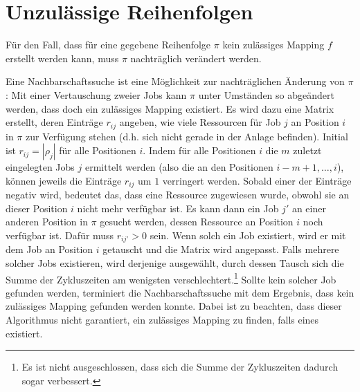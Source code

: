 \documentclass{scrreprt}
\begin{document}
\section{Unzulässige Reihenfolgen}
\label{sec:UnzulaessigeReihenfolgen}
Für den Fall, dass für eine gegebene Reihenfolge $\pi$ kein zulässiges Mapping $f$ erstellt werden kann, muss $\pi$ nachträglich verändert werden.

Eine Nachbarschaftssuche ist eine Möglichkeit zur nachträglichen Änderung von $\pi$:
Mit einer Vertauschung zweier Jobs kann $\pi$ unter Umständen so abgeändert werden, dass doch ein zulässiges Mapping existiert.
Es wird dazu eine Matrix erstellt, deren Einträge $r_{ij}$ angeben, wie viele Ressourcen für Job $j$ an Position $i$ in $\pi$ zur Verfügung stehen
(d.h. sich nicht gerade in der Anlage befinden).
Initial ist $r_{ij}=|\rho_j|$ für alle Positionen $i$.
Indem für alle Positionen $i$ die $m$ zuletzt eingelegten Jobs $j$ ermittelt werden (also die an den Positionen $i-m+1,\ldots,i$),
können jeweils die Einträge $r_{ij}$ um $1$ verringert werden.
Sobald einer der Einträge negativ wird, bedeutet das, dass eine Ressource zugewiesen wurde, obwohl sie an dieser Position $i$ nicht mehr verfügbar ist.
Es kann dann ein Job $j'$ an einer anderen Position in $\pi$ gesucht werden, dessen Ressource an Position $i$ noch verfügbar ist.
Dafür muss $r_{ij'}>0$ sein.
Wenn solch ein Job existiert, wird er mit dem Job an Position $i$ getauscht und die Matrix wird angepasst.
Falls mehrere solcher Jobs existieren, wird derjenige ausgewählt, durch dessen Tausch sich die Summe der Zykluszeiten am wenigsten verschlechtert.\footnote{
Es ist nicht ausgeschlossen, dass sich die Summe der Zykluszeiten dadurch sogar verbessert.}
Sollte kein solcher Job gefunden werden, terminiert die Nachbarschaftssuche mit dem Ergebnis, dass kein zulässiges Mapping gefunden werden konnte.
Dabei ist zu beachten, dass dieser Algorithmus nicht garantiert, ein zulässiges Mapping zu finden, falls eines existiert.


\end{document}
